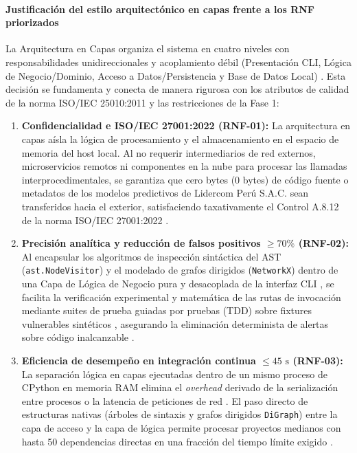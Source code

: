 \paragraph*{Justificación del estilo arquitectónico en capas frente a los RNF priorizados}
La Arquitectura en Capas organiza el sistema en cuatro niveles con responsabilidades unidireccionales y acoplamiento débil (Presentación CLI, Lógica de Negocio/Dominio, Acceso a Datos/Persistencia y Base de Datos Local) \cite{pressman2020software, sommerville2016software}. Esta decisión se fundamenta y conecta de manera rigurosa con los atributos de calidad de la norma ISO/IEC 25010:2011 \cite{iso2011sqa} y las restricciones de la Fase 1:

\begin{enumerate}
    \item \textbf{Confidencialidad e ISO/IEC 27001:2022 (RNF-01):} 
    La arquitectura en capas aísla la lógica de procesamiento y el almacenamiento en el espacio de memoria del host local. Al no requerir intermediarios de red externos, microservicios remotos ni componentes en la nube para procesar las llamadas interprocedimentales, se garantiza que cero bytes (0 bytes) de código fuente o metadatos de los modelos predictivos de Lidercom Perú S.A.C. sean transferidos hacia el exterior, satisfaciendo taxativamente el Control A.8.12 de la norma ISO/IEC 27001:2022 \cite{ladisa2023sok, gutierrez2024auditoria}.

    \item \textbf{Precisión analítica y reducción de falsos positivos $\ge 70\%$ (RNF-02):} 
    Al encapsular los algoritmos de inspección sintáctica del AST (\texttt{ast.\allowbreak NodeVisitor}) y el modelado de grafos dirigidos (\texttt{NetworkX}) dentro de una Capa de Lógica de Negocio pura y desacoplada de la interfaz CLI \cite{salis2021pycg, hagberg2008exploring}, se facilita la verificación experimental y matemática de las rutas de invocación mediante suites de prueba guiadas por pruebas (TDD) sobre fixtures vulnerables sintéticos \cite{myers2011art}, asegurando la eliminación determinista de alertas sobre código inalcanzable \cite{pashchenko2022vuln4real}.

    \item \textbf{Eficiencia de desempeño en integración continua $\le 45\text{ s}$ (RNF-03):} 
    La separación lógica en capas ejecutadas dentro de un mismo proceso de CPython en memoria RAM elimina el \textit{overhead} derivado de la serialización entre procesos o la latencia de peticiones de red \cite{humble2010continuous}. El paso directo de estructuras nativas (árboles de sintaxis y grafos dirigidos \texttt{DiGraph}) entre la capa de acceso y la capa de lógica permite procesar proyectos medianos con hasta 50 dependencias directas en una fracción del tiempo límite exigido \cite{hagberg2008exploring}.


\end{enumerate}
